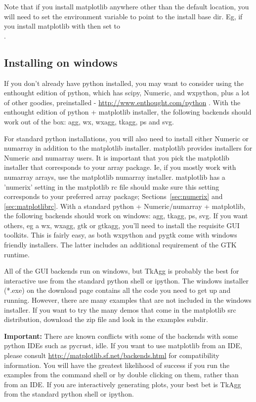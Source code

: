 \documentclass[twoside]{book}
\begin{document}
Note that if you install matplotlib anywhere other than the default
location, you will need to set the  environment
variable to point to the install base dir.  Eg, if you install
matplotlib with 
then set  to\\
.
 
    
\subsection{Installing on windows}

If you don't already have python installed, you may want to consider
using the enthought edition of python, which has scipy, Numeric, and
wxpython, plus a lot of other goodies, preinstalled -
\url{http://www.enthought.com/python} .  With the enthought edition of
python + matplotlib installer, the following backends should work out
of the box: agg, wx, wxagg, tkagg, ps and svg.

For standard python installations, you will also need to install
either Numeric or numarray in addition to the matplotlib installer.
matplotlib provides installers for Numeric and numarray users.  It is
important that you pick the matplotlib installer that corresponds to
your array package.  Ie, if you mostly work with numarray arrays, use
the matplotlib numarray installer.  matplotlib has a 'numerix' setting
in the matplotlib rc file should make sure this setting corresponds to
your preferred array package; Sections~\ref{sec:numerix} and
\ref{sec:matplotlibrc}. With a standard python + Numeric/numarray +
matplotlib, the following backends should work on windows: agg, tkagg,
ps, svg.  If you want others, eg a wx, wxagg, gtk or gtkagg, you'll
need to install the requisite GUI toolkits.  This is fairly easy, as
both wxpython and pygtk come with windows friendly installers.  The
latter includes an additional requirement of the GTK runtime.

All of the GUI backends run on windows, but TkAgg is probably the best
for interactive use from the standard python shell or ipython.  The
windows installer (*.exe) on the download page contains all the code
you need to get up and running.  However, there are many examples that
are not included in the windows installer.  If you want to try the
many demos that come in the matplotlib src distribution, download the
zip file and look in the examples subdir.

\textbf{Important:} There are known conflicts with some of the
backends with some python IDEs such as pycrust, idle.  If you want to
use matplotlib from an IDE, please consult
\url{http://matplotlib.sf.net/backends.html} for compatibility
information.  You will have the greatest likelihood of success if you
run the examples from the command shell or by double clicking on them,
rather than from an IDE.  If you are interactively generating plots,
your best bet is TkAgg from the standard python shell or ipython.
\end{document}
